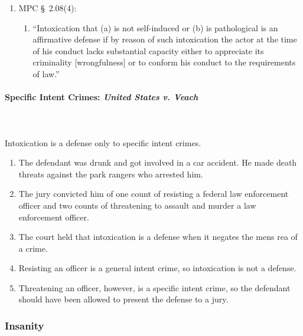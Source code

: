 \begin{enumerate}
\begin{enumerate}
\begin{enumerate}
        \end{enumerate}
        \item MPC \S\ 2.08(4):
        \begin{enumerate}
            \item ``Intoxication that (a) is not self-induced or (b) is 
            pathological is an affirmative defense if by reason of such 
            intoxication the actor at the time of his conduct lacks 
            substantial capacity either to appreciate its criminality 
            [wrongfulness] or to conform his conduct to the requirements of 
            law.''
        \end{enumerate}
    \end{enumerate}
\end{enumerate}

\paragraph{Specific Intent Crimes: \emph{United States v. Veach}}
~\\\\
Intoxication is a defense only to specific intent crimes.

\begin{enumerate}
    \item The defendant was drunk and got involved in a car accident. He made 
    death threats against the park rangers who arrested him.
    \item The jury convicted him of one count of resisting a federal law 
    enforcement officer and two counts of threatening to assault and murder a 
    law enforcement officer.
    \item The court held that intoxication is a defense when it negates the 
    mens rea of a crime.
    \item Resisting an officer is a general intent crime, so intoxication is 
    not a defense.
    \item Threatening an officer, however, is a specific intent crime, so the 
    defendant should have been allowed to present the defense to a jury.
\end{enumerate}

\subsubsection{Insanity}


